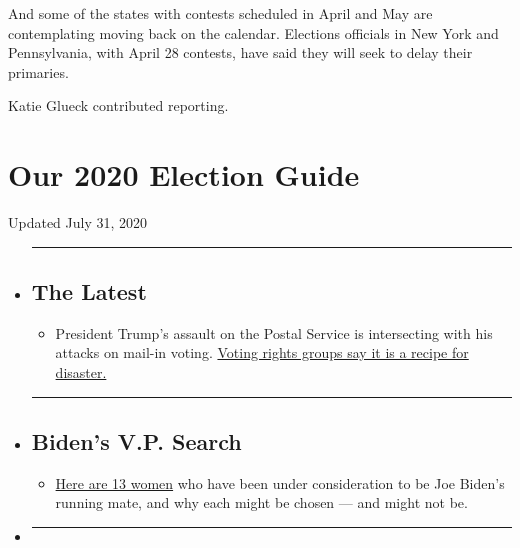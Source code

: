 And some of the states with contests scheduled in April and May are
contemplating moving back on the calendar. Elections officials in New
York and Pennsylvania, with April 28 contests, have said they will seek
to delay their primaries.

Katie Glueck contributed reporting.

\hypertarget{our-2020-election-guide}{%
\section{Our 2020 Election Guide}\label{our-2020-election-guide}}

Updated July 31, 2020

\begin{itemize}
\item
  \begin{center}\rule{0.5\linewidth}{\linethickness}\end{center}

  \hypertarget{the-latest}{%
  \subsection{The Latest}\label{the-latest}}

  \begin{itemize}
  \tightlist
  \item
    President Trump's assault on the Postal Service is intersecting with
    his attacks on mail-in voting.
    \href{https://www.nytimes.com/2020/07/31/us/politics/trump-usps-mail-delays.html?action=click\&pgtype=Article\&state=default\&region=BELOW_MAIN_CONTENT\&context=storylines_guide}{Voting
    rights groups say it is a recipe for disaster.}
  \end{itemize}
\item
  \begin{center}\rule{0.5\linewidth}{\linethickness}\end{center}

  \hypertarget{bidens-vp-search}{%
  \subsection{Biden's V.P. Search}\label{bidens-vp-search}}

  \begin{itemize}
  \tightlist
  \item
    \href{https://www.nytimes.com/article/biden-vice-president-2020.html?action=click\&pgtype=Article\&state=default\&region=BELOW_MAIN_CONTENT\&context=storylines_guide}{Here
    are 13 women} who have been under consideration to be Joe Biden's
    running mate, and why each might be chosen --- and might not be.
  \end{itemize}
\item
  \begin{center}\rule{0.5\linewidth}{\linethickness}\end{center}


\end{itemize}
